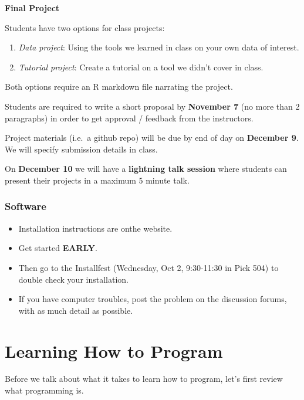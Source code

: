\documentclass[]{book}
\providecommand{\tightlist}{%
  \setlength{\itemsep}{0pt}\setlength{\parskip}{0pt}}
\begin{document}
\textbf{Final Project}

Students have two options for class projects:

\begin{enumerate}
\def\labelenumi{\arabic{enumi}.}
\item
  \emph{Data project}: Using the tools we learned in class on your own data of interest.
\item
  \emph{Tutorial project}: Create a tutorial on a tool we didn't cover in class.
\end{enumerate}

Both options require an R markdown file narrating the project.

Students are required to write a short proposal by \textbf{November 7} (no more than 2 paragraphs) in order to get approval / feedback from the instructors.

Project materials (i.e.~a github repo) will be due by end of day on \textbf{December 9}. We will specify submission details in class.

On \textbf{December 10} we will have a \textbf{lightning talk session} where students can present their projects in a maximum 5 minute talk.

\hypertarget{software}{%
\subsubsection*{Software}\label{software}}

\begin{itemize}
\tightlist
\item
  Installation instructions are onthe website.
\item
  Get started \textbf{EARLY}.
\item
  Then go to the Installfest (Wednesday, Oct 2, 9:30-11:30 in Pick 504) to double check your installation.
\item
  If you have computer troubles, post the problem on the discussion forums, with as much detail as possible.
\end{itemize}

\hypertarget{learning-how-to-program}{%
\section{Learning How to Program}\label{learning-how-to-program}}

Before we talk about what it takes to learn how to program, let's first review what programming is.
\end{document}
